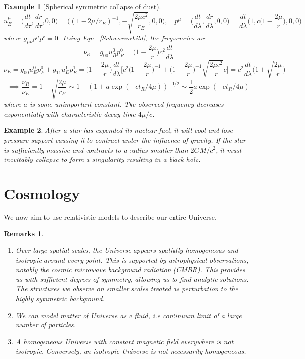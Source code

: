 \documentclass[a4paper]{article}
\newtheorem{eg}{Example}[section]
\newtheorem{remarks}{Remarks}[section]
\theoremstyle{new}
\begin{document}
\begin{eg}[Spherical symmetric collapse of dust]
$$u_E^\mu=\bigg(\frac{dt}{d\tau},\frac{dr}{d\tau},0,0\bigg)=\bigg((1-2\mu/r_E)^{-1},-\sqrt{\frac{2\mu c^2}{r_E}},0,0\bigg),\quad p^\mu=\bigg(\frac{dt}{d\lambda},\frac{dr}{d\lambda},0,0\bigg)=\frac{dt}{d\lambda}\bigg(1,c\bigg(1-\frac{2\mu}{r}\bigg),0,0\bigg)$$
where $g_{\mu\nu}p^\mu p^\nu=0$. Using Eqn.~\ref{Schwarzschild}, the frequencies are
$$\nu_R=g_{00}u^0_Rp^0_R=\bigg(1-\frac{2\mu}{r}\bigg)c^2\frac{dt}{d\lambda}$$
$$\nu_E=g_{00}u_E^0p_E^0+g_{11}u_E^1p_E^1=\bigg(1-\frac{2\mu}{r}\bigg)\frac{dt}{d\lambda}\bigg[c^2\bigg(1-\frac{2\mu}{r}\bigg)^{-1}+\bigg(1-\frac{2\mu}{r}\bigg)^{-1}\sqrt{\frac{2\mu c^2}{r}}c\bigg]=c^2\frac{dt}{d\lambda}\bigg(1+\sqrt{\frac{2\mu}{r}}\bigg)$$
$$\implies\frac{\nu_R}{\nu_E}=1-\sqrt{\frac{2\mu}{r_E}}\sim 1-(1+a\exp(-ct_R/4\mu))^{-1/2}\sim\frac{1}{2}a\exp(-ct_R/4\mu)$$
where $a$ is some unimportant constant. The observed frequency decreases exponentially with characteristic decay time $4\mu/c$.
\end{eg}
\begin{eg}
After a star has expended its nuclear fuel, it will cool and lose pressure support causing it to contract under the influence of gravity. If the star is sufficiently massive and contracts to a radius smaller than $2GM/c^2$, it must inevitably collapse to form a singularity resulting in a black hole.
\end{eg}
\newpage
\section{Cosmology}
We now aim to use relativistic models to describe our entire Universe.
\begin{remarks}\leavevmode
\begin{enumerate}
\item Over large spatial scales, the Universe appears spatially homogeneous and isotropic around every point. This is supported by astrophysical observations, notably the cosmic microwave background radiation (CMBR). This provides us with sufficient degrees of symmetry, allowing us to find analytic solutions. The structures we observe on smaller scales treated as perturbation to the highly symmetric background.
\item We can model matter of Universe as a fluid, i.e continuum limit of a large number of particles.
\item A homogeneous Universe with constant magnetic field everywhere is not isotropic. Conversely, an isotropic Universe is not necessarily homogeneous.
\end{enumerate}
\end{remarks}
\end{document}
